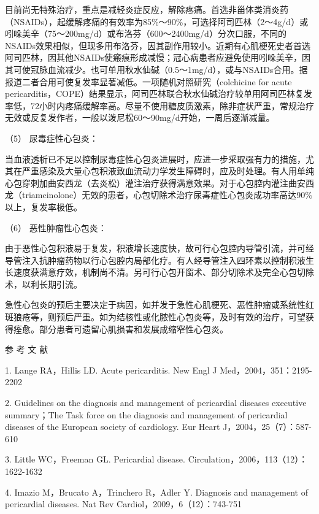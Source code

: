 目前尚无特殊治疗，重点是减轻炎症反应，解除疼痛。首选非甾体类消炎药（NSAIDs），起缓解疼痛的有效率为85\%～90\%，可选择阿司匹林（2～4g/d）或吲哚美辛（75～200mg/d）或布洛芬（600～2400mg/d）分次口服，不同的NSAIDs效果相似，但现多用布洛芬，因其副作用较小。近期有心肌梗死史者首选阿司匹林，因其他NSAIDs使瘢痕形成减慢；冠心病患者应避免使用吲哚美辛，因其可使冠脉血流减少。也可单用秋水仙碱（0.5～1mg/d），或与NSAIDs合用。据报道二者合用可使复发率显著减低。一项随机对照研究（colchicine
for acute
pericarditis，COPE）结果显示，阿司匹林联合秋水仙碱治疗较单用阿司匹林复发率低，72小时内疼痛缓解率高。尽量不使用糖皮质激素，除非症状严重，常规治疗无效或反复发作者，一般以泼尼松60～90mg/d开始，一周后逐渐减量。

\hypertarget{text00302.htmlux5cux23CHP10-4-3-3-5}{}
（5） 尿毒症性心包炎：

当血液透析已不足以控制尿毒症性心包炎进展时，应进一步采取强有力的措施，尤其在严重感染及大量心包积液致血流动力学发生障碍时，应及时处理。有人用单纯心包穿刺加曲安西龙（去炎松）灌注治疗获得满意效果。对于心包腔内灌注曲安西龙（triamcinolone）无效的患者，心包切除术治疗尿毒症性心包炎成功率高达90\%以上，复发率极低。

\hypertarget{text00302.htmlux5cux23CHP10-4-3-3-6}{}
（6） 恶性肿瘤性心包炎：

由于恶性心包积液易于复发，积液增长速度快，故可行心包腔内导管引流，并可经导管注入抗肿瘤药物以行心包腔内局部化疗。有人经导管注入四环素以控制积液生长速度获满意疗效，机制尚不清。另可行心包开窗术、部分切除术及完全心包切除术，以利长期引流。

急性心包炎的预后主要决定于病因，如并发于急性心肌梗死、恶性肿瘤或系统性红斑狼疮等，则预后严重。如为结核性或化脓性心包炎等，及时有效的治疗，可望获得痊愈。部分患者可遗留心肌损害和发展成缩窄性心包炎。

\protect\hypertarget{text00303.html}{}{}

\hypertarget{text00303.htmlux5cux23CHP10-4-4}{}
参 考 文 献

1. Lange RA，Hillis LD. Acute pericarditis. New Engl J
Med，2004，351：2195-2202

2. Guidelines on the diagnosis and management of pericardial diseases
executive summary；The Task force on the diagnosis and management of
pericardial diseases of the European society of cardiology. Eur Heart
J，2004，25（7）：587-610

3. Little WC，Freeman GL. Pericardial disease.
Circulation，2006，113（12）：1622-1632

4. Imazio M，Brucato A，Trinchero R，Adler Y. Diagnosis and management
of pericardial diseases. Nat Rev Cardiol，2009，6（12）：743-751

